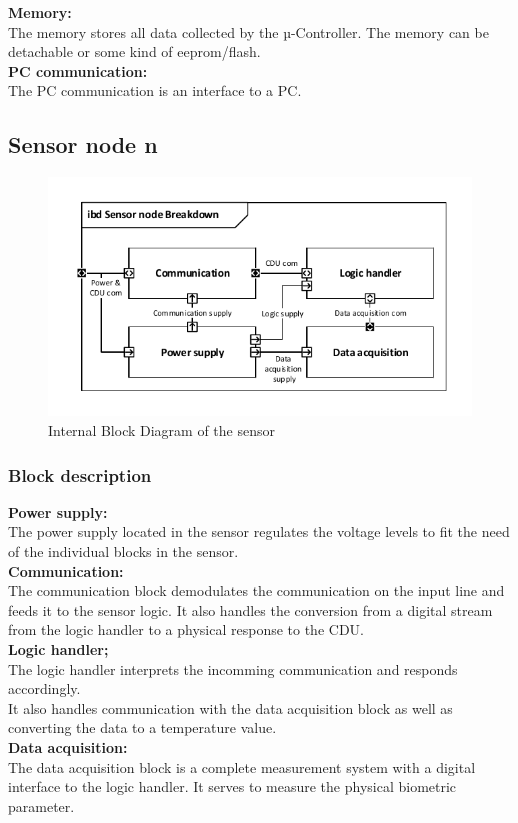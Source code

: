 \textbf{Memory:}\\
The memory stores all data collected by the µ-Controller. The memory can be detachable or some kind of eeprom/flash.\\

\textbf{PC communication:}\\
The PC communication is an interface to a PC.\\


\subsection{Sensor node n}

\begin{figure}[hbpt]
\centering
\includegraphics[width=.8\textwidth]{billeder/Sensor_IBD}
\caption{Internal Block Diagram of the sensor}
\label{Sensor_IBD}
\end{figure}

\subsubsection{Block description}

\textbf{Power supply:}\\
The power supply located in the sensor regulates the voltage levels to fit the need of the individual blocks in the sensor.\\

\textbf{Communication:}\\
The communication block demodulates the communication on the input line and feeds it to the sensor logic. It also handles the conversion from a digital stream from the logic handler to a physical response to the CDU.\\

\textbf{Logic handler;}\\
The logic handler interprets the incomming communication and responds accordingly.\\
It also handles communication with the data acquisition block as well as converting the data to a temperature value.\\

\textbf{Data acquisition:}\\
The data acquisition block is a complete measurement system with a digital interface to the logic handler. It serves to measure the physical biometric parameter.\\



